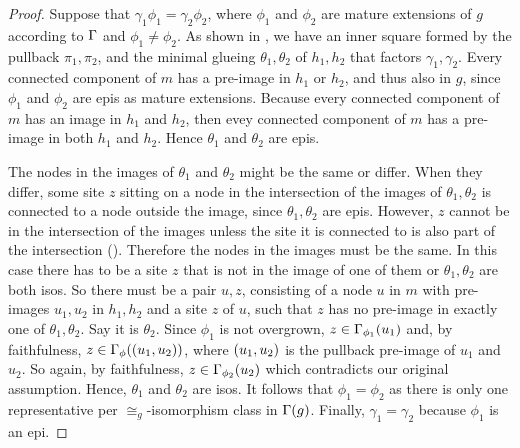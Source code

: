 \begin{proof}
  Suppose that $\gamma_1 \phi_1 = \gamma_2 \phi_2$,
  where $\phi_1$ and $\phi_2$ are mature extensions of $g$
  according to $\Gamma$ and $\phi_1 \neq \phi_2$.
  As shown in ,
  we have an inner square formed by the pullback $\pi_1,\pi_2$,
  and the minimal glueing $\theta_1,\theta_2$ of $h_1,h_2$
  that factors $\gamma_1,\gamma_2$.
  Every connected component of $m$
  has a pre-image in $h_1$ or $h_2$,
  and thus also in $g$,
  since $\phi_1$ and $\phi_2$ are epis
  as mature extensions.
  Because every connected component of $m$
  has an image in $h_1$ and $h_2$,
  then evey connected component of $m$
  has a pre-image in both $h_1$ and $h_2$.
  Hence $\theta_1$ and $\theta_2$ are epis.

  The nodes in the images of $\theta_1$ and $\theta_2$
  might be the same or differ.
  When they differ, some site $z$ sitting on a node
  in the intersection of the images of $\theta_1,\theta_2$
  is connected to a node outside the image,
  since $\theta_1,\theta_2$ are epis.
  However, $z$ cannot be in the intersection of the images
  unless the site it is connected to is also part of the intersection
  ().
  Therefore the nodes in the images must be the same.
  In this case there has to be a site $z$
  that is not in the image of one of them
  or $\theta_1,\theta_2$ are both isos.
  So there must be a pair $u,z$,
  consisting of a node $u$ in $m$
  with pre-images $u_1,u_2$ in $h_1,h_2$
  and a site $z$ of $u$,
  such that $z$ has no pre-image
  in exactly one of $\theta_1,\theta_2$.
  Say it is $\theta_2$.
  Since $\phi_1$ is not overgrown,
  $z \in \Gamma_{\phi_1}(u_1)$ and, by faithfulness,
  $z \in \Gamma_\phi(\left(u_1,u_2\right))$,
  where $\left(u_1,u_2\right)$ is
  the pullback pre-image of $u_1$ and $u_2$.
  So again, by faithfulness, $z \in \Gamma_{\phi_2}(u_2)$
  which contradicts our original assumption.
  Hence, $\theta_1$ and $\theta_2$ are isos.
  It follows that $\phi_1 = \phi_2$ as there is only
  one representative per $\cong_g$-isomorphism class in $\Gamma(g)$.
  Finally, $\gamma_1 = \gamma_2$ because $\phi_1$ is an epi.
\end{proof}

